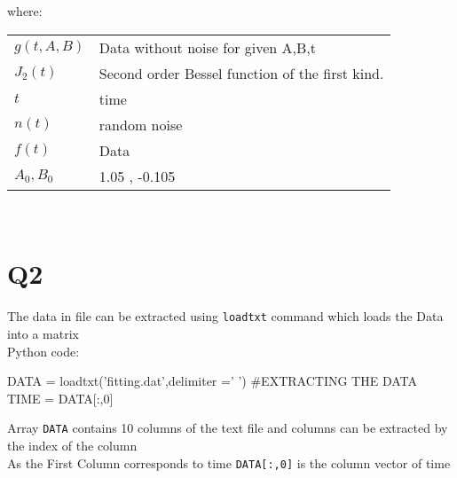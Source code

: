 \documentclass[12pt, a4paper]{report}
\makeatletter
\newenvironment{conditions}[1][where:]
  {#1 \begin{tabular}[t]{>{$}l<{$} @{${}={}$} l}}
  {\end{tabular}\\[\belowdisplayskip]}
\makeatother
\begin{document}
\begin{conditions}
g(t,A,B)     & Data without noise for given A,B,t \\
J_2(t)     &  Second order Bessel function of the first kind.\\
t & time \\
n(t) & random noise\\ 
f(t) & Data\\ 
A_0,B_0 &1.05 , -0.105
\end{conditions}
\section*{Q2}  
The data in file can be extracted using \texttt{loadtxt} command which loads the Data into a matrix\\ 
Python code:
\begin{py_code}
    DATA = loadtxt('fitting.dat',delimiter =' ') #EXTRACTING THE DATA
    TIME = DATA[:,0]
\end{py_code}
Array \texttt{DATA} contains 10 columns of the text file and columns can be extracted by the index of the column \\
As the First Column corresponds to time \texttt{DATA[:,0]} is the column vector of time\\
\end{document}
